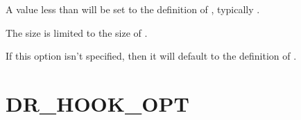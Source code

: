 \documentclass[letterpaper,10pt,english]{sphinxmanual}
\begin{document}
\sphinxAtStartPar
A value less than  will be set to the definition of , typically .

\sphinxAtStartPar
The size is limited to the size of .

\sphinxAtStartPar
If this option isn’t specified, then it will default to the definition of .


\section{DR\_HOOK\_OPT}
\label{\detokenize{flag/flag:dr-hook-opt}}\label{\detokenize{flag/flag:id242}}
\end{document}
